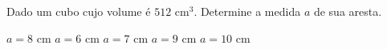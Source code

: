 Dado um cubo cujo volume é $512$ cm$^3$. Determine a medida $a$ de sua aresta.

$a=8$ cm
$a=6$ cm
$a=7$ cm
$a=9$ cm
$a=10$ cm

